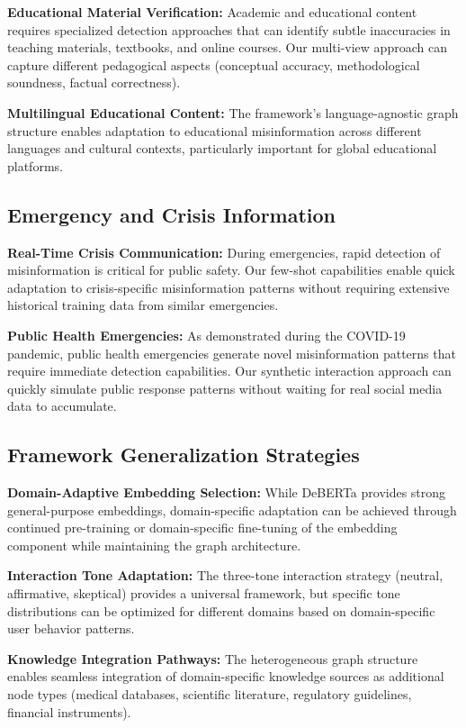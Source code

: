 \textbf{Educational Material Verification:} Academic and educational content requires specialized detection approaches that can identify subtle inaccuracies in teaching materials, textbooks, and online courses. Our multi-view approach can capture different pedagogical aspects (conceptual accuracy, methodological soundness, factual correctness).

\textbf{Multilingual Educational Content:} The framework's language-agnostic graph structure enables adaptation to educational misinformation across different languages and cultural contexts, particularly important for global educational platforms.

\subsection{Emergency and Crisis Information}

\textbf{Real-Time Crisis Communication:} During emergencies, rapid detection of misinformation is critical for public safety. Our few-shot capabilities enable quick adaptation to crisis-specific misinformation patterns without requiring extensive historical training data from similar emergencies.

\textbf{Public Health Emergencies:} As demonstrated during the COVID-19 pandemic, public health emergencies generate novel misinformation patterns that require immediate detection capabilities. Our synthetic interaction approach can quickly simulate public response patterns without waiting for real social media data to accumulate.

\subsection{Framework Generalization Strategies}

\textbf{Domain-Adaptive Embedding Selection:} While DeBERTa provides strong general-purpose embeddings, domain-specific adaptation can be achieved through continued pre-training or domain-specific fine-tuning of the embedding component while maintaining the graph architecture.

\textbf{Interaction Tone Adaptation:} The three-tone interaction strategy (neutral, affirmative, skeptical) provides a universal framework, but specific tone distributions can be optimized for different domains based on domain-specific user behavior patterns.

\textbf{Knowledge Integration Pathways:} The heterogeneous graph structure enables seamless integration of domain-specific knowledge sources as additional node types (medical databases, scientific literature, regulatory guidelines, financial instruments).

